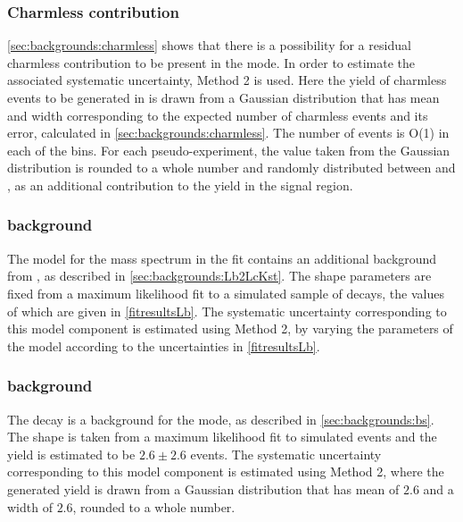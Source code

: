 \subsubsection{Charmless contribution}

\Sect\ref{sec:backgrounds:charmless} shows that there is a possibility for a residual charmless contribution to be present in the \pipi mode. In order to estimate the associated systematic uncertainty, Method 2 is used. Here the yield of charmless events to be generated in \pipi is drawn from a Gaussian distribution that has mean and width corresponding to the expected number of charmless events and its error, calculated in \sect\ref{sec:backgrounds:charmless}. The number of events is O(1) in each of the bins. For each pseudo-experiment, the value taken from the Gaussian distribution is rounded to a whole number and randomly distributed between \Bp and \Bm, as an additional contribution to the yield in the signal region. 

\subsubsection{\boldmath {} background}

The model for the \kk mass spectrum in the \CP fit contains an additional background from , as described in \sect\ref{sec:backgrounds:Lb2LcKst}. The shape parameters are fixed from a maximum likelihood fit to a simulated sample of  decays, the values of which are given in \tab\ref{fitresultsLb}. The systematic uncertainty corresponding to this model component is estimated using Method 2, by varying the parameters of the model according to the uncertainties in \tab\ref{fitresultsLb}.

\subsubsection{\boldmath {} background}

The decay  is a background for the \pik mode, as described in \sect\ref{sec:backgrounds:bs}. The shape is taken from a maximum likelihood fit to simulated events and the yield is estimated to be $2.6 \pm 2.6$ events. The systematic uncertainty corresponding to this model component is estimated using Method 2, where the generated yield is drawn from a Gaussian distribution that has mean of $2.6$ and a width of $2.6$, rounded to a whole number.

